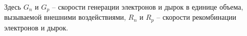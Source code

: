 \documentclass[a4paper,14pt]{extarticle}
\renewcommand{\vec}{\mathbf} %
\begin{document}
Здесь $G_n$ и $G_p$ -- скорости генерации электронов и дырок в единице объема, вызываемой внешними воздействиями, $R_n$ и $R_p$ -- скорости рекомбинации электронов и дырок.




\end{document}
